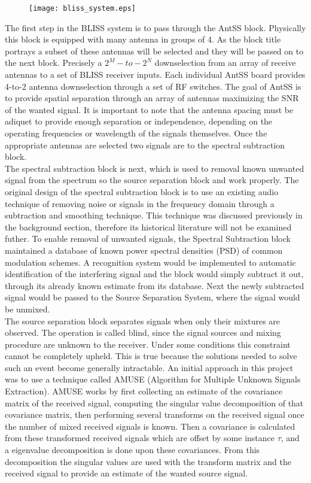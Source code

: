 \begin{figure}\label{bliss_system}
\texttt{[image: bliss\_system.eps]}
\end{figure}

The first step in the BLISS system is to pass through the AntSS block.  Physically this block is equipped with many antenna in groups of 4.  As the block title portrays a subset of these antennas will be selected and they will be passed on to the next block.  Precisely a \(2^{M}-to-2^{N}\) downselection from an array of receive antennas to a set of BLISS receiver inputs. Each individual AntSS board provides 4-to-2 antenna downselection through a set of RF switches.  The goal of AntSS is to provide spatial separation through an array of antennas maximizing the SNR of the wanted signal.  It is important to note that the antenna spacing must be adiquet to provide enough separation or independence, depending on the operating frequencies or wavelength of the signals themselves.  Once the appropriate antennas are selected two signals are to the spectral subtraction block.\\

The spectral subtraction block is next, which is used to removal known unwanted signal from the spectrum so the source separation block and work properly.  The original design of the spectral subtraction block is to use an existing audio technique of removing noise or signals in the frequency domain through a subtraction and smoothing technique.  This technique was discussed previously in the background section, therefore its historical literature will not be examined futher.  To enable removal of unwanted signals, the Spectral Subtraction block maintained a database of known power spectral densities (PSD) of common modulation schemes.  A recognition system would be implemented to automatic identification of the interfering signal and the block would simply subtract it out, through its already known estimate from its database.  Next the newly subtracted signal would be passed to the Source Separation System, where the signal would be unmixed.\\

The source separation block separates signals when only their mixtures are observed.  The operation is called blind, since the signal sources and mixing procedure are unknown to the receiver.  Under some conditions this constraint cannot be completely upheld.  This is true because the solutions needed to solve such an event become generally intractable.  An initial approach in this project was to use a technique called AMUSE (Algorithm for Multiple Unknown Signals Extraction)\cite{amuse}.  AMUSE works by first collecting an estimate of the covariance matrix of the received signal, computing the singular value decomposition of that covariance matrix, then performing several transforms on the received signal once the number of mixed received signals is known.  Then a covariance is calculated from these transformed received signals which are offset by some instance \(\tau\), and a eigenvalue decomposition is done upon these covariances.  From this decomposition the singular values are used with the transform matrix and the received signal to provide an estimate of the wanted source signal.\\

